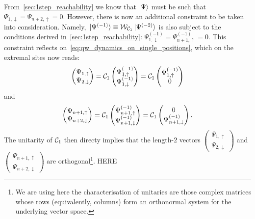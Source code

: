 From~\cref{sec:1step_reachability} we know that $\ket\Psi$ must be such that
$\Psi_{1,\downarrow}=\Psi_{n+2,\uparrow}=0$.
However, there is now an additional constraint to be taken into consideration. Namely, $\ket*{\Psi^{(-1)}}\equiv{\mathcal{W}}_{{\mathcal{C}}_1}\ket*{\Psi^{(-2)}}$ is also subject to the conditions derived in~\cref{sec:1step_reachability}:
$\Psi^{(-1)}_{1,\downarrow}=\Psi^{(-1)}_{n+1,\uparrow}=0$.
This constraint reflects on~\cref{eq:qw_dynamics_on_single_positions}, which on the extremal sites now reads:
\begin{equation}
    \begin{pmatrix}
        \Psi_{1,\uparrow} \\
        \Psi_{2,\downarrow}
    \end{pmatrix} =
    {\mathcal{C}}_1
    \begin{pmatrix}
        \Psi^{(-1)}_{1,\uparrow} \\
        \Psi^{(-1)}_{1,\downarrow}
    \end{pmatrix} =
    {\mathcal{C}}_1
    \begin{pmatrix}
        \Psi^{(-1)}_{1,\uparrow} \\ 0
    \end{pmatrix}
\end{equation}
and
\begin{equation}
    \begin{pmatrix}
        \Psi_{n+1,\uparrow} \\
        \Psi_{n+2,\downarrow}
    \end{pmatrix} =
    {\mathcal{C}}_1
    \begin{pmatrix}
        \Psi^{(-1)}_{n+1,\uparrow} \\
        \Psi^{(-1)}_{n+1,\downarrow}
    \end{pmatrix} =
    {\mathcal{C}}_1
    \begin{pmatrix}
        0 \\
        \Psi^{(-1)}_{n+1,\downarrow}
    \end{pmatrix}.
\end{equation}
The unitarity of ${\mathcal{C}}_1$ then directy implies that the length-$2$ vectors
$\begin{pmatrix}
    \Psi_{1,\uparrow} \\
    \Psi_{2,\downarrow}
\end{pmatrix}$
and
$\begin{pmatrix}
    \Psi_{n+1,\uparrow} \\
    \Psi_{n+2,\downarrow}
\end{pmatrix}$
are orthogonal\footnote{We are using here the characterisation of unitaries are those complex matrices whose rows (equivalently, columns) form an orthonormal system for the underlying vector space.}.
HERE

